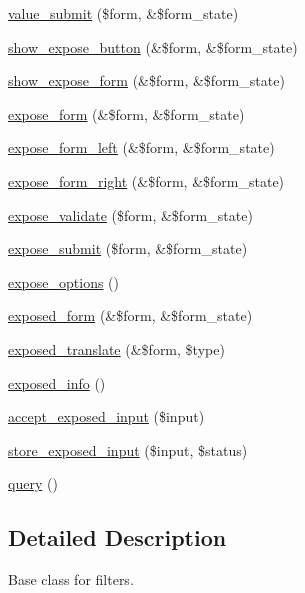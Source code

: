 \begin{CompactItemize}
\item 
\hyperlink{classviews__handler__filter_e71b3b09b75932ec6a8db33d56d41035}{value\_\-submit} (\$form, \&\$form\_\-state)
\item 
\hyperlink{classviews__handler__filter_fa388297472d32d4bcb976bf3515d16a}{show\_\-expose\_\-button} (\&\$form, \&\$form\_\-state)
\item 
\hyperlink{classviews__handler__filter_9499b1d69007e5921acef6277da4fc1d}{show\_\-expose\_\-form} (\&\$form, \&\$form\_\-state)
\item 
\hyperlink{classviews__handler__filter_9537c9a30fb9008361efdfdde46633cd}{expose\_\-form} (\&\$form, \&\$form\_\-state)
\item 
\hyperlink{classviews__handler__filter_649a8a303815d4013500716cb1f0f8bc}{expose\_\-form\_\-left} (\&\$form, \&\$form\_\-state)
\item 
\hyperlink{classviews__handler__filter_5f175df5f03b5e4e23e4168870de05d8}{expose\_\-form\_\-right} (\&\$form, \&\$form\_\-state)
\item 
\hyperlink{classviews__handler__filter_30b7f718c7c152dfedb3fc444bd1304c}{expose\_\-validate} (\$form, \&\$form\_\-state)
\item 
\hyperlink{classviews__handler__filter_4b18e3bdbb306d4932bdf612893845c9}{expose\_\-submit} (\$form, \&\$form\_\-state)
\item 
\hyperlink{classviews__handler__filter_07ab6afc47bf892fb5fd5934c3f1d64c}{expose\_\-options} ()
\item 
\hyperlink{classviews__handler__filter_f97b055d96353032bebd186c66bbb5eb}{exposed\_\-form} (\&\$form, \&\$form\_\-state)
\item 
\hyperlink{classviews__handler__filter_08e8d0f9aa1a45ee427f1a8ec63fca91}{exposed\_\-translate} (\&\$form, \$type)
\item 
\hyperlink{classviews__handler__filter_5405764212dfafae60fa032c217461b4}{exposed\_\-info} ()
\item 
\hyperlink{classviews__handler__filter_88ccd2ef359009614abb48fb83c2a738}{accept\_\-exposed\_\-input} (\$input)
\item 
\hyperlink{classviews__handler__filter_7ad1d1cd56293ca452be9e7d5cfd8b94}{store\_\-exposed\_\-input} (\$input, \$status)
\item 
\hyperlink{classviews__handler__filter_8e513b3abbc2559f37b550ca4957b4ae}{query} ()
\end{CompactItemize}


\subsection{Detailed Description}
Base class for filters. 

